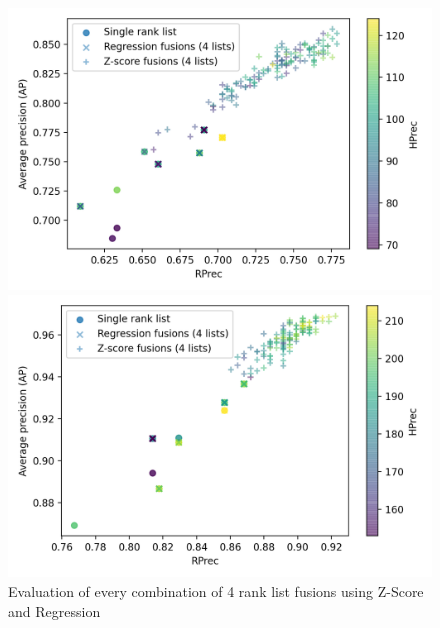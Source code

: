\begin{figure}
  \centering
  \caption{Evaluation of every combination of 4 rank list fusions using Z-Score and Regression}
  \label{fig:fusions}

  \label{fig:fusion_B_A}
  \includegraphics[width=\linewidth]{img/fusion_B_A.png}

  \label{fig:fusion_A_B}
  \includegraphics[width=\linewidth]{img/fusion_A_B.png}
\end{figure}

